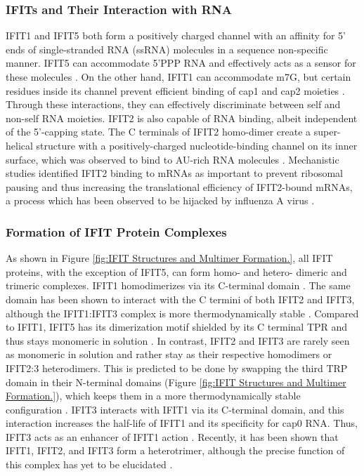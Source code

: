 \subsubsection{IFITs and Their Interaction with RNA} \label{IFITs and Their Interaction with RNA}
IFIT1 and IFIT5 both form a positively charged channel with an affinity for 5' ends of single-stranded RNA (ssRNA) molecules in a sequence non-specific manner. IFIT5 can accommodate 5'PPP RNA and effectively acts as a sensor for these molecules \cite{Abbas2013StructuralProteins, Pichlmair2011IFIT1RNA}. On the other hand, IFIT1 can accommodate m7G, but certain residues inside its channel prevent efficient binding of cap1 and cap2 moieties \cite{Diamond2014IFIT1:Translation, Mears2018BetterResponse}. Through these interactions, they can effectively discriminate between self and non-self RNA moieties. IFIT2 is also capable of RNA binding, albeit independent of the 5'-capping state. The C terminals of IFIT2 homo-dimer create a super-helical structure with a positively-charged nucleotide-binding channel on its inner surface, which was observed to bind to AU-rich RNA molecules \cite{Yang2012CrystalMechanisms, Vladimer2014IFITs:Proteins}. Mechanistic studies identified IFIT2 binding to mRNAs as important to prevent ribosomal pausing and thus increasing the translational efficiency of IFIT2-bound mRNAs, a process which has been observed to be hijacked by influenza A virus \cite{Tran2020InfluenzaMRNAs}.

\subsubsection{Formation of IFIT Protein Complexes} \label{Formation of IFIT Protein Complexes}
As shown in Figure \ref{fig:IFIT Structures and Multimer Formation.}, all IFIT proteins, with the exception of IFIT5, can form homo- and hetero- dimeric and trimeric complexes. IFIT1 homodimerizes via its C-terminal domain \cite{Abbas2013StructuralProteins}. The same domain has been shown to interact with the C termini of both IFIT2 and IFIT3, although the IFIT1:IFIT3 complex is more thermodynamically stable \cite{Fleith2018IFIT3RNA}. Compared to IFIT1, IFIT5 has its dimerization motif shielded by its C terminal TPR and thus stays monomeric in solution \cite{Kumar2014InhibitionMRNAs}. In contrast, IFIT2 and IFIT3 are rarely seen as monomeric in solution and rather stay as their respective homodimers or IFIT2:3 heterodimers. This is predicted to be done by swapping the third TRP domain in their N-terminal domains (Figure \ref{fig:IFIT Structures and Multimer Formation.}), which keeps them in a more thermodynamically stable configuration \cite{Yang2012CrystalMechanisms}. IFIT3 interacts with IFIT1 via its C-terminal domain, and this interaction increases the half-life of IFIT1 and its specificity for cap0 RNA. Thus, IFIT3 acts as an enhancer of IFIT1 action \cite{Fleith2018IFIT3RNA, Johnson2018HumanStability}. Recently, it has been shown that IFIT1, IFIT2, and IFIT3 form a heterotrimer, although the precise function of this complex has yet to be elucidated \cite{Fleith2018IFIT3RNA}. 

